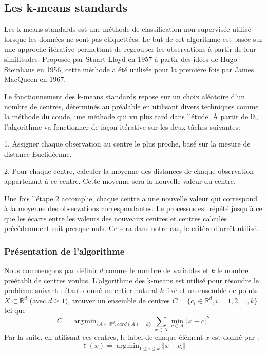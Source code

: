 \documentclass[12pt,a4paper]{book}
\newcommand{\R}{\mathbb{R}}
\newcommand{\1}{\mathds{1}}
\DeclareMathOperator*{\argmin}{arg\!\min}
\begin{document}
\subsection{Les k-means standards}

Les k-means standards est une méthode de classification non-supervisée utilisé lorsque les données ne sont pas étiquettées. Le but de cet algorithme est basée sur une approche itérative permettant de regrouper les observations à partir de leur similitudes. Proposée par Stuart Lloyd en 1957 à partir des idées de Hugo Steinhaus en 1956, cette méthode a été utilisée pour la première fois par James MacQueen en 1967.

Le fonctionnement des k-means standards repose sur un choix aléatoire d'un nombre de centres, déterminés au préalable en utilisant divers techniques comme la méthode du coude, une méthode qui vu plus tard dans l'étude. À partir de là, l'algorithme va fonctionner de façon itérative sur les deux tâches suivantes:
\begin{description}
  \item 1. Assigner chaque observation au centre le plus proche, basé sur la mesure de distance Euclidéenne.
  \item 2. Pour chaque centre, calculer la moyenne des distances de chaque observation appartenant à ce centre. Cette moyenne sera la nouvelle valeur du centre.

\end{description}

Une fois l'étape 2 accomplie, chaque centre a une nouvelle valeur qui correspond à la moyenne des observations correspondantes. Le processus est répété jusqu'à ce que les écarts entre les valeurs des nouveaux centres et centres calculés précédemment soit presque nuls. Ce sera dans notre cas, le critère d'arrêt utilisé.

\subsubsection{Présentation de l'algorithme}

Nous commençons par définir $d$ comme le nombre de variables et $k$ le nombre préétabli de centres voulus.
L'algorithme des k-means est utilisé pour résoudre le problème suivant : étant donné un entier natural $k$ fixé et un ensemble de points $X \subset \R^d$ (avec $d \geq 1$), trouver un ensemble de centres $C = \{ c_i \in \R^d, i=1,2,...,k \}$ tel que 
\begin{equation}\label{probleme_kmeans}
	C = \argmin_{\{ A \subset \R^d, card(A)=k \}}\sum_{x \in X} \min_{c \in A} \Vert x-c \Vert^2
\end{equation}
Par la suite, en utilisant ces centres, le label de chaque élément $x$ est donné par :
$$
	\ell (x) = \argmin_{1 \leq i \leq k} \Vert x - c_i \Vert
$$
\end{document}
